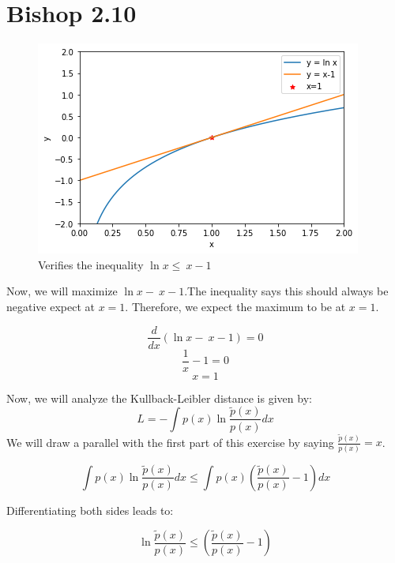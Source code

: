 \documentclass[12pt, letterpaper]{article}
\begin{document}
\section*{Bishop 2.10}
\begin{figure}[h]
\caption{Verifies the inequality $\ln x \leq \ x-1$}
\centering
\includegraphics[width=0.8\linewidth]{Kullback_Leibler.png}
\end{figure}

Now, we will maximize $\ln x - \ x-1$.The inequality says this should always be negative expect at $x=1$. Therefore, we expect the maximum to be at $x=1$. 

\begin{equation}
\frac{d}{dx}( \ln x - \ x-1) = 0
\end{equation}
\begin{equation}
\frac{1}{x} - 1 = 0
\end{equation}
\begin{equation}
x = 1
\end{equation}

Now, we will analyze the Kullback-Leibler distance is given by:
\begin{equation}
L = - \int p(x) \ln \frac{\tilde{p}(x)}{p(x)} dx
\end{equation}
We will draw a parallel with the first part of this exercise by saying $\frac{\tilde{p}(x)}{p(x)} = x$. 

\begin{equation}
\int p(x) \ln \frac{\tilde{p}(x)}{p(x)} dx \leq \int p(x) (\frac{\tilde{p}(x)}{p(x)}-1) dx 
\end{equation}

Differentiating both sides leads to:

\begin{equation}
 \ln \frac{\tilde{p}(x)}{p(x)} \leq (\frac{\tilde{p}(x)}{p(x)}-1)  
\end{equation}
\end{document}
